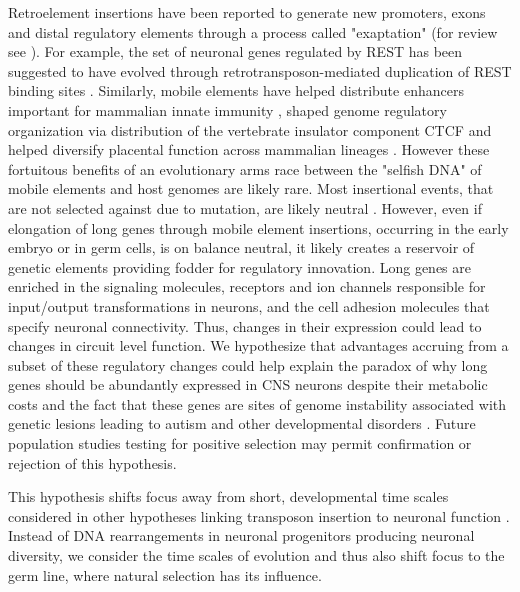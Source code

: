 Retroelement insertions have been reported to generate new promoters, exons and distal regulatory elements through a process called "exaptation" (for review see \cite{Chuong_2016}). For example, the set of neuronal genes regulated by REST has been suggested to have evolved through retrotransposon-mediated duplication of REST binding sites \citep{Johnson_2006}. Similarly, mobile elements have helped distribute enhancers important for mammalian innate immunity \cite{Chuong_2016a}, shaped genome regulatory organization via distribution of the vertebrate insulator component CTCF \citep{Schmidt_2012} and helped diversify placental function across mammalian lineages \citep{Chuong_2013}. However these fortuitous benefits of an evolutionary arms race between the "selfish DNA" of mobile elements and host genomes are likely rare. Most insertional events, that are not selected against due to mutation, are likely neutral \cite{Zhang_2011}. However, even if elongation of long genes through mobile element insertions, occurring in the early embryo or in germ cells, is on balance neutral, it likely creates a reservoir of genetic elements providing fodder for regulatory innovation. Long genes are enriched in the signaling molecules, receptors and ion channels responsible for input/output transformations in neurons, and the cell adhesion molecules that specify neuronal connectivity. Thus, changes in their expression could lead to changes in circuit level function. We hypothesize that advantages accruing from a subset of these regulatory changes could help explain the paradox of why long genes should be abundantly expressed in CNS neurons despite their metabolic costs and the fact that these genes are sites of genome instability associated with genetic lesions leading to autism and other developmental disorders \citep{Wei_2016}. Future population studies testing for positive selection may permit confirmation or rejection of this hypothesis.   


This hypothesis shifts focus away from short, developmental time scales considered in other hypotheses linking transposon insertion to neuronal function \citep{Muotri_2005,Richardson_2014,Perrat_2013}. Instead of DNA rearrangements in neuronal progenitors producing neuronal diversity, we consider the time scales of evolution and thus also shift focus to the germ line, where natural selection has its influence. 



